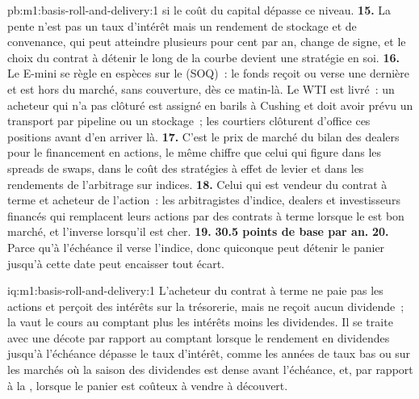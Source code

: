 \begin{solution}{pb:m1:basis-roll-and-delivery:1}
si le coût du capital dépasse ce niveau.
\textbf{15.} La pente n'est pas un taux d'intérêt mais un rendement de stockage et de
convenance, qui peut atteindre plusieurs pour cent par an, change de signe, et le choix
du contrat à détenir le long de la courbe devient une stratégie en soi.
\textbf{16.} Le E-mini se règle en espèces sur le  (SOQ)~: le fonds reçoit ou verse une dernière  et est hors
du marché, sans couverture, dès ce matin-là. Le WTI est livré~: un acheteur qui n'a pas
clôturé est assigné en barils à Cushing et doit avoir prévu un transport par pipeline ou
un stockage~; les courtiers clôturent d'office ces positions avant d'en arriver là.
\textbf{17.} C'est le prix de marché du bilan des dealers pour le financement en
actions, le même chiffre que celui qui figure dans les spreads de swaps, dans le coût des
stratégies à effet de levier et dans les rendements de l'arbitrage sur indices.
\textbf{18.} Celui qui est vendeur du contrat à terme et acheteur de l'action~: les
arbitragistes d'indice, dealers et investisseurs financés qui remplacent leurs actions par des
contrats à terme lorsque le  est bon marché, et l'inverse lorsqu'il est cher.
\textbf{19.} \textbf{30.5 points de base par an.}
\textbf{20.} Parce qu'à l'échéance il verse l'indice, donc quiconque peut détenir le
panier jusqu'à cette date peut encaisser tout écart.
\end{solution}

\begin{solution}{iq:m1:basis-roll-and-delivery:1}
L'acheteur du contrat à terme ne paie pas les actions et perçoit des intérêts sur
la trésorerie, mais ne reçoit aucun dividende~; la  vaut le cours au comptant
plus les intérêts moins les dividendes. Il se traite avec une décote par rapport au
comptant lorsque le rendement en dividendes jusqu'à l'échéance dépasse le taux d'intérêt,
comme les années de taux bas ou sur les marchés où la saison des dividendes est dense avant
l'échéance, et, par rapport à la , lorsque le panier est coûteux à vendre à découvert.
\end{solution}

